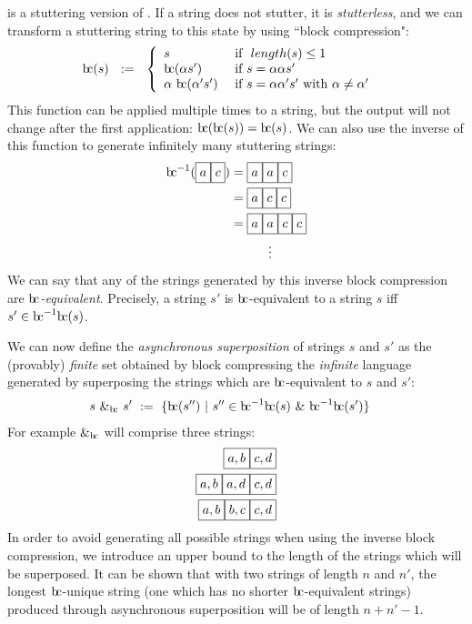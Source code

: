 \documentclass[a4paper,11pt]{article}
\newcommand{\bc}{{\rm b\!c}}
\newcommand{\vph}[1]{\vphantom{#1}}
\begin{document}
 is a stuttering version of 
\fbox{$a\vph{'}$}\fbox{$c\vph{'}$}. If 
a string does not 
stutter, it is \textit{stutterless}, and we can transform a stuttering string 
to this 
state by using ``block compression":
\begin{align*}
\bc(s)  &\ \ :=\ \
\left\{ \begin{array}{ll}
s & \mbox{ if }~length(s)\leq 1 \\
\bc({\alpha}s')  & \mbox{ if } s={\alpha}{\alpha}s'\\
\alpha ~{\bc}({\alpha'}{s'})  
& \mbox{ if } s=\alpha{\alpha'}{s'} \mbox{ with } \alpha\neq\alpha'
\end{array}
\right. 
\end{align*}
This function can be applied multiple times to a string, but the output will 
not change after the first application: $\bc(\bc(s)) = \bc(s)$. We can also use 
the inverse of this function to generate infinitely many stuttering strings:
\begin{align*}
\bc^{-1}(\fbox{$a\vph{,'}$}\fbox{$c\vph{,'}$}) & = 
\fbox{$a\vph{,'}$}\fbox{$a\vph{,'}$}\fbox{$c\vph{,'}$} \\
& = \fbox{$a\vph{,'}$}\fbox{$c\vph{,'}$}\fbox{$c\vph{,'}$} \\
& = \fbox{$a\vph{,'}$}\fbox{$a\vph{,'}$}\fbox{$c\vph{,'}$}\fbox{$c\vph{,'}$} \\
& \hspace{3em} \vdots
\end{align*}
We can say that any of the strings generated by this inverse block compression 
are \textit{$\bc{}$-equivalent}. Precisely, a string $s'$ is $\bc{}$-equivalent 
to a 
string 
$s$ iff $s' \in \bc^{-1}\bc(s)$.

We can now define the \textit{asynchronous superposition} of strings $s$ and 
$s'$ as the (provably) \textit{finite} set obtained by block compressing the 
\textit{infinite} 
language generated by superposing the strings which are $\bc$-equivalent to $s$ 
and $s'$:
\begin{align*}
s\ \&_{\bc} \ s' & \ := \
\{\bc(s'') \ | \ s''\in \bc^{-1}\bc(s)\ \& \ \bc^{-1}\bc(s')\}
\end{align*}
For example \fbox{$a\vph{,'}$}\fbox{$c\vph{,'}$} $\&_{\bc}$ 
\fbox{$b\vph{,'}$}\fbox{$d\vph{,'}$} will comprise 
three strings:
\begin{align*}
\fbox{$a, b\vph{,'}$}\fbox{$c, d\vph{,'}$}\\
\fbox{$a, b\vph{,'}$}\fbox{$a, d\vph{,'}$}\fbox{$c, d\vph{,'}$}\\
\fbox{$a, b\vph{,'}$}\fbox{$b, c\vph{,'}$}\fbox{$c, d\vph{,'}$}\\
\end{align*}
In order to avoid generating all possible strings when using the inverse block 
compression, we introduce an upper bound to the length of the strings which 
will be superposed. It can be shown that with two strings of length $n$ and 
$n'$, the longest $\bc$-unique string (one which has no shorter 
$\bc$-equivalent strings) produced through asynchronous superposition will be 
of length $n+n'-1$.
\end{document}
